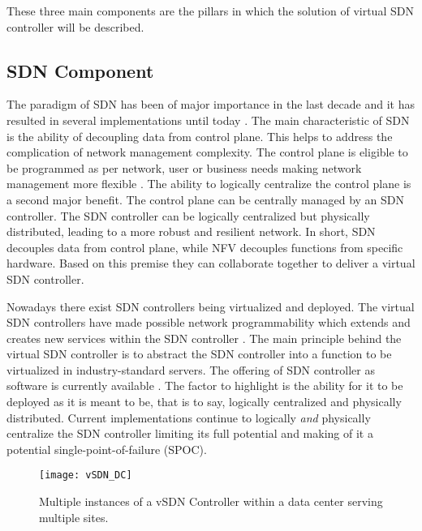 \documentclass[sigconf]{Template}
\begin{document}
\noindent These three main components are the pillars in which the solution of virtual SDN controller will be described.

\subsection{SDN Component}\label{VSDN_Controller}

The paradigm of SDN has been of major importance in the last decade and it has resulted in several implementations until today \cite{jarschel2014interfaces_SDN}. The main characteristic of SDN is the ability of decoupling data from control plane. This helps to address the complication of network management complexity. The control plane is eligible to be programmed as per network, user or business needs making network management more flexible \cite{jarschel2014interfaces_SDN}. The ability to logically centralize the control plane is a second major benefit. The control plane can be centrally managed by an SDN controller. The SDN controller can be logically centralized but physically distributed, leading to a more robust and resilient network. In short, SDN decouples data from control plane, while NFV decouples functions from specific hardware. Based on this premise they can collaborate together to deliver a virtual SDN controller.

Nowadays there exist SDN controllers being virtualized and deployed. The virtual SDN controllers have made possible network programmability which extends and creates new services within the SDN controller \cite{mijumbi2016_NFV_stateofart}. The main principle behind the virtual SDN controller is to abstract the SDN controller into a function to be virtualized in industry-standard servers. The offering of SDN controller as software is currently available \cite{doherty2016sdn}. The factor to highlight is the ability for it to be deployed as it is meant to be, that is to say, logically centralized and physically distributed. Current implementations continue to logically \emph{and} physically centralize the SDN controller limiting its full potential and making of it a potential single-point-of-failure (SPOC).

\begin{figure}[h]
	\centering
	\texttt{[image: vSDN\_DC]}
	\caption{Multiple instances of a vSDN Controller within a data center serving multiple sites.}
	\label{fig:vSDN_Controller_DC}
\end{figure}
\end{document}
